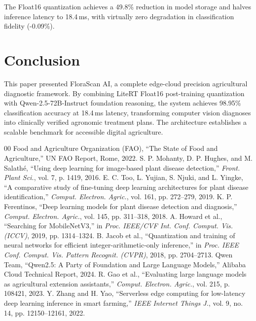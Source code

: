 \documentclass[conference]{IEEEtran}
\begin{document}
The Float16 quantization achieves a 49.8\% reduction in model storage and halves inference latency to 18.4\,ms, with virtually zero degradation in classification fidelity (-0.09\%).

\section{Conclusion}
This paper presented FloraScan AI, a complete edge-cloud precision agricultural diagnostic framework. By combining LiteRT Float16 post-training quantization with Qwen-2.5-72B-Instruct foundation reasoning, the system achieves 98.95\% classification accuracy at 18.4\,ms latency, transforming computer vision diagnoses into clinically verified agronomic treatment plans. The architecture establishes a scalable benchmark for accessible digital agriculture.

\begin{thebibliography}{00}
 Food and Agriculture Organization (FAO), ``The State of Food and Agriculture,'' UN FAO Report, Rome, 2022.
 S. P. Mohanty, D. P. Hughes, and M. Salath\'e, ``Using deep learning for image-based plant disease detection,'' \textit{Front. Plant Sci.}, vol. 7, p. 1419, 2016.
 E. C. Too, L. Yujian, S. Njuki, and L. Yingke, ``A comparative study of fine-tuning deep learning architectures for plant disease identification,'' \textit{Comput. Electron. Agric.}, vol. 161, pp. 272--279, 2019.
 K. P. Ferentinos, ``Deep learning models for plant disease detection and diagnosis,'' \textit{Comput. Electron. Agric.}, vol. 145, pp. 311--318, 2018.
 A. Howard et al., ``Searching for MobileNetV3,'' in \textit{Proc. IEEE/CVF Int. Conf. Comput. Vis. (ICCV)}, 2019, pp. 1314--1324.
 B. Jacob et al., ``Quantization and training of neural networks for efficient integer-arithmetic-only inference,'' in \textit{Proc. IEEE Conf. Comput. Vis. Pattern Recognit. (CVPR)}, 2018, pp. 2704--2713.
 Qwen Team, ``Qwen2.5: A Party of Foundation and Large Language Models,'' Alibaba Cloud Technical Report, 2024.
 R. Gao et al., ``Evaluating large language models as agricultural extension assistants,'' \textit{Comput. Electron. Agric.}, vol. 215, p. 108421, 2023.
 Y. Zhang and H. Yao, ``Serverless edge computing for low-latency deep learning inference in smart farming,'' \textit{IEEE Internet Things J.}, vol. 9, no. 14, pp. 12150--12161, 2022.
\end{thebibliography}
\end{document}
